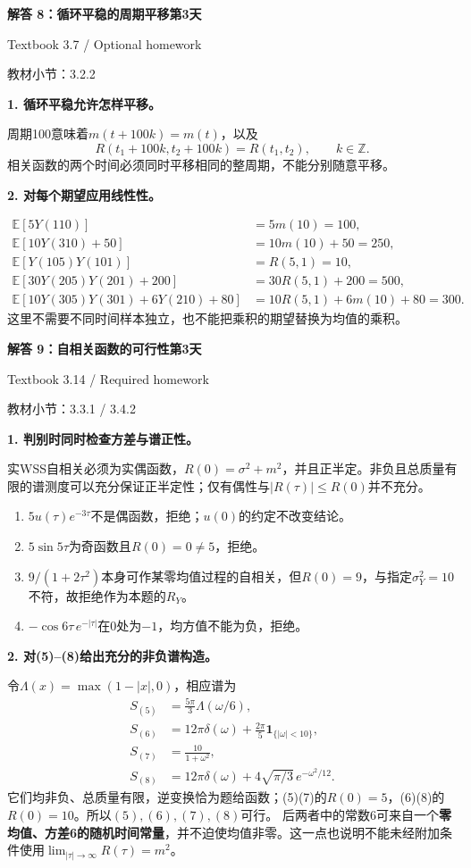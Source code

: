 \documentclass[10.5pt,fontset=fandol]{ctexart}
\newcommand{\E}{\mathbb E}\newcommand{\ee}{\mathrm e}\newcommand{\jj}{\mathrm j}
\newcommand{\qtitle}[2]{\par\addvspace{.85em}\Needspace{10\baselineskip}\begin{tcolorbox}[colback=navy,colframe=navy,arc=1.5pt,boxrule=0pt]\color{white}\large\bfseries #1\hfill\small #2\end{tcolorbox}}
\newcommand{\step}[1]{\par\addvspace{.4em}\Needspace{4\baselineskip}\textbf{#1}\par}\hypersetup{pdftitle={SSA Chapter 3 Review Solutions - Chinese}}
\begin{document}
\qtitle{解答 8：循环平稳的周期平移}{第3天}
{\small\color{accentred}Textbook 3.7 / Optional homework}\par{\small\color{muted}教材小节：3.2.2}\par\smallskip\step{1. 循环平稳允许怎样平移。}
周期100意味着$m(t+100k)=m(t)$，以及
\[R(t_1+100k,t_2+100k)=R(t_1,t_2),\qquad k\in\mathbb Z.\]
相关函数的两个时间必须同时平移相同的整周期，不能分别随意平移。
\step{2. 对每个期望应用线性性。}
\[\begin{aligned}
\E[5Y(110)]&=5m(10)=\boxed{100},\\
\E[10Y(310)+50]&=10m(10)+50=\boxed{250},\\
\E[Y(105)Y(101)]&=R(5,1)=\boxed{10},\\
\E[30Y(205)Y(201)+200]&=30R(5,1)+200=\boxed{500},\\
\E[10Y(305)Y(301)+6Y(210)+80]&=10R(5,1)+6m(10)+80=\boxed{300}.
\end{aligned}\]
这里不需要不同时间样本独立，也不能把乘积的期望替换为均值的乘积。

\qtitle{解答 9：自相关函数的可行性}{第3天}
{\small\color{accentred}Textbook 3.14 / Required homework}\par{\small\color{muted}教材小节：3.3.1 / 3.4.2}\par\smallskip\step{1. 判别时同时检查方差与谱正性。}
实WSS自相关必须为实偶函数，$R(0)=\sigma^2+m^2$，并且正半定。非负且总质量有限的谱测度可以充分保证正半定性；仅有偶性与$|R(\tau)|\le R(0)$并不充分。
\begin{enumerate}
\item $5u(\tau)e^{-3\tau}$不是偶函数，拒绝；$u(0)$的约定不改变结论。
\item $5\sin5\tau$为奇函数且$R(0)=0\ne5$，拒绝。
\item $9/(1+2\tau^2)$本身可作某零均值过程的自相关，但$R(0)=9$，与指定$\sigma_Y^2=10$不符，故拒绝作为本题的$R_Y$。
\item $-\cos6\tau\,e^{-|\tau|}$在0处为$-1$，均方值不能为负，拒绝。
\end{enumerate}
\step{2. 对(5)--(8)给出充分的非负谱构造。}
令$\Lambda(x)=\max(1-|x|,0)$，相应谱为
\[\begin{aligned}
S_{(5)}&=\frac{5\pi}{3}\Lambda(\omega/6),\\
S_{(6)}&=12\pi\delta(\omega)+\frac{2\pi}{5}\mathbf1_{\{|\omega|<10\}},\\
S_{(7)}&=\frac{10}{1+\omega^2},\\
S_{(8)}&=12\pi\delta(\omega)+4\sqrt{\pi/3}\,e^{-\omega^2/12}.
\end{aligned}\]
它们均非负、总质量有限，逆变换恰为题给函数；(5)(7)的$R(0)=5$，(6)(8)的$R(0)=10$。所以$\boxed{(5),(6),(7),(8)\text{可行}}$。
后两者中的常数6可来自一个\textbf{零均值、方差6的随机时间常量}，并不迫使均值非零。这一点也说明不能未经附加条件使用$\lim_{|\tau|\to\infty}R(\tau)=m^2$。
\end{document}
